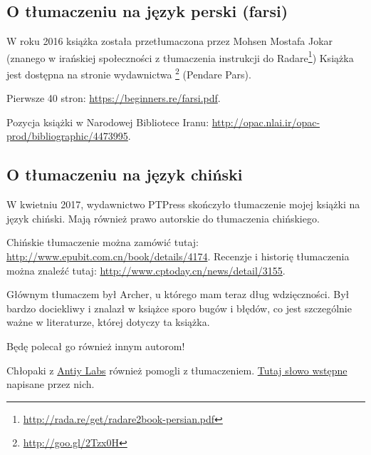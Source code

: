 \subsection*{O tłumaczeniu na język perski (farsi)}

W roku 2016 książka została przetłumaczona przez Mohsen Mostafa Jokar (znanego w irańskiej społeczności z tłumaczenia instrukcji do Radare\footnote{\url{http://rada.re/get/radare2book-persian.pdf}})
Książka jest dostępna na stronie wydawnictwa \footnote{\url{http://goo.gl/2Tzx0H}} (Pendare Pars).

Pierwsze 40 stron: \url{https://beginners.re/farsi.pdf}.

Pozycja książki w Narodowej Bibliotece Iranu: \url{http://opac.nlai.ir/opac-prod/bibliographic/4473995}.

\subsection*{O tłumaczeniu na język chiński}

W kwietniu 2017, wydawnictwo PTPress skończyło tłumaczenie mojej książki na język chiński. Mają również prawo autorskie do tłumaczenia chińskiego.

Chińskie tłumaczenie można zamówić tutaj: \url{http://www.epubit.com.cn/book/details/4174}. Recenzje i historię tłumaczenia można znaleźć tutaj: \url{http://www.cptoday.cn/news/detail/3155}.

Głównym tłumaczem był Archer, u którego mam teraz dług wdzięczności.
Był bardzo dociekliwy i znalazł w książce sporo bugów i błędów, co jest szczególnie ważne w literaturze, której dotyczy ta książka.

Będę polecał go również innym autorom!

Chłopaki z \href{http://www.antiy.net/}{Antiy Labs} również pomogli z tłumaczeniem. \href{http://www.epubit.com.cn/book/onlinechapter/51413}{Tutaj słowo wstępne} napisane przez nich.


